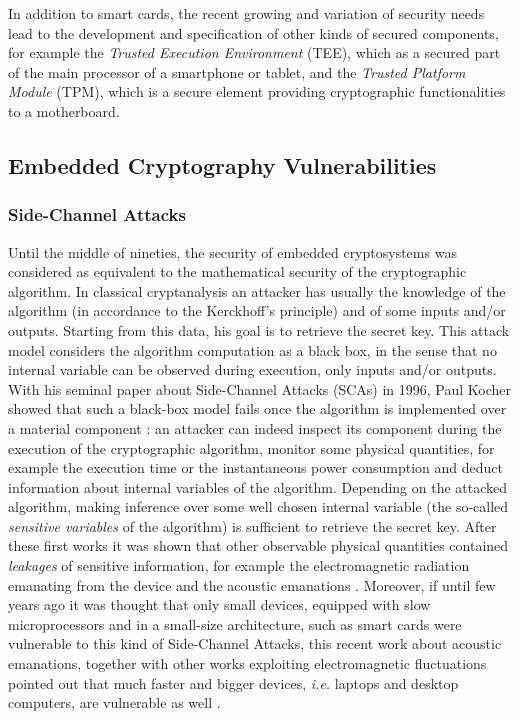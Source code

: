 In addition to smart cards, the recent growing and variation of security needs lead to the development and specification of other kinds of secured components, for example the \emph{Trusted Execution Environment} (TEE), which as a secured part of the main processor of a smartphone or tablet, and the \emph{Trusted Platform Module} 
(TPM), which is a secure element providing cryptographic functionalities to a motherboard. 

\subsection{Embedded Cryptography Vulnerabilities}
\subsubsection{Side-Channel Attacks}
Until the middle of nineties, the security of embedded cryptosystems was considered as equivalent to the mathematical security of the cryptographic algorithm. In classical cryptanalysis an attacker has usually the knowledge of the algorithm (in accordance to the Kerckhoff's principle) and of some inputs and/or outputs. Starting from this data, his goal is to retrieve the secret key. This attack model considers the algorithm computation as a black box, in the sense that no internal variable can be observed during execution, only inputs and/or outputs. With his seminal paper about Side-Channel Attacks (SCAs) in 1996, Paul Kocher showed that such a black-box model fails once the algorithm is implemented over a material component \cite{kocher1996timing}: an attacker can indeed inspect its component during the execution of the cryptographic algorithm, monitor some physical quantities, for example the execution time \cite{kocher1996timing} or the instantaneous power consumption \cite{kocher1999differential} and deduct information about internal variables of the algorithm. Depending on the attacked algorithm, making inference over some well chosen internal variable (the so-called \emph{sensitive variables} of the algorithm) is sufficient to retrieve the secret key. After these first works it was shown that other observable physical quantities contained \emph{leakages} of sensitive information, for example the electromagnetic radiation emanating from the device \cite{gandolfi2001electromagnetic,quisquater2001electromagnetic} and the acoustic emanations \cite{genkin2014rsa}. Moreover, if until few years ago it was thought that only small devices, equipped with slow microprocessors and in a small-size architecture, such as smart cards were vulnerable to this kind of Side-Channel Attacks, this recent work about acoustic emanations, together with other works exploiting electromagnetic fluctuations pointed out that much faster and bigger devices, \emph{i.e.} laptops and desktop computers, are vulnerable as well \cite{genkin2015stealing,genkin2015get,genkin2016ecdh}.

